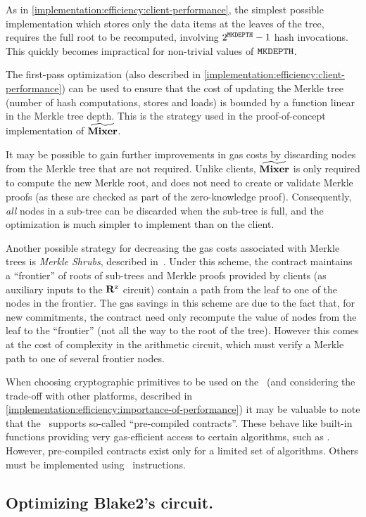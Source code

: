 As in \cref{implementation:efficiency:client-performance}, the simplest possible implementation which stores only the data items at the leaves of the tree, requires the full root to be recomputed, involving $2^{\mathtt{MKDEPTH}} - 1$ hash invocations. This quickly becomes impractical for non-trivial values of $\mathtt{MKDEPTH}$.

The first-pass optimization (also described in \cref{implementation:efficiency:client-performance}) can be used to ensure that the cost of updating the Merkle tree (number of hash computations, stores and loads) is bounded by a function linear in the Merkle tree depth. This is the strategy used in the proof-of-concept implementation of $\widetilde{\mathbf{Mixer}}$.

It may be possible to gain further improvements in gas costs by discarding nodes from the Merkle tree that are not required. Unlike clients, $\widetilde{\mathbf{Mixer}}$ is only required to compute the new Merkle root, and does not need to create or validate Merkle proofs (as these are checked as part of the zero-knowledge proof). Consequently, \emph{all} nodes in a sub-tree can be discarded when the sub-tree is full, and the optimization is much simpler to implement than on the client.

Another possible strategy for decreasing the gas costs associated with Merkle trees is \emph{Merkle Shrubs}, described in~\cite[Section 2.2]{merkle-shrubs}. Under this scheme, the contract maintains a ``frontier'' of roots of sub-trees and Merkle proofs provided by clients (as auxiliary inputs to the $\mathbf{R}^{\texttt{z}}$ circuit) contain a path from the leaf to one of the nodes in the frontier. The gas savings in this scheme are due to the fact that, for new commitments, the contract need only recompute the value of nodes from the leaf to the ``frontier'' (not all the way to the root of the tree). However this comes at the cost of complexity in the arithmetic circuit, which must verify a Merkle path to one of several frontier nodes.

When choosing cryptographic primitives to be used on the \evm~(and considering the trade-off with other platforms, described in \cref{implementation:efficiency:importance-of-performance}) it may be valuable to note that the \evm~supports so-called ``pre-compiled contracts''. These behave like built-in functions providing very gas-efficient access to certain algorithms, such as \keccak. However, pre-compiled contracts exist only for a limited set of algorithms. Others must be implemented using \evm~instructions.

\subsection{Optimizing Blake2's circuit.}\label{implementation:efficiency:blake}

